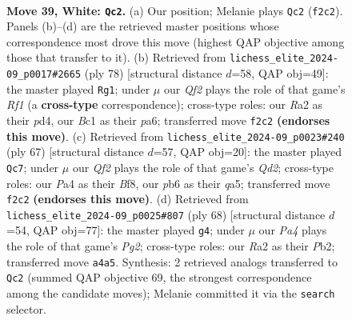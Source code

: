 \documentclass[11pt]{article}
\begin{document}
\begin{figure}[p]\centering
\begin{subfigure}{0.46\textwidth}\centering
\resizebox{\linewidth}{!}{%
\newchessgame
\chessboard[
  setfen={7r/r3k3/1pp1p1p1/3q2p1/Pp1P4/3KP3/R4Q2/2B5 w - - 0 39},
  showmover=false,
  pgfstyle=straightmove, color=movearrow, markmove={f2-c2}
]}
\caption{}
\end{subfigure}\hfill
\begin{subfigure}{0.46\textwidth}\centering
\resizebox{\linewidth}{!}{%
\newchessgame
\chessboard[
  setfen={6rk/7p/p4q2/4pP2/1p1pQ3/1P1P3P/P6K/5R2 w - - 5 40},
  showmover=false,
  pgfstyle=straightmove, color=movearrow, markmove={f1-g1}
]}
\caption{}
\end{subfigure}
\\[4pt]
\begin{subfigure}{0.46\textwidth}\centering
\resizebox{\linewidth}{!}{%
\newchessgame
\chessboard[
  setfen={3k1b1r/3q1pp1/3p4/Q5Pp/1P1RpP1P/8/1BP5/1K6 b - - 2 34},
  showmover=false,
  pgfstyle=straightmove, color=movearrow, markmove={d7-c7}
]}
\caption{}
\end{subfigure}\hfill
\begin{subfigure}{0.46\textwidth}\centering
\resizebox{\linewidth}{!}{%
\newchessgame
\chessboard[
  setfen={4r1k1/5pp1/8/2p5/p7/PqPQ3P/1P4P1/K2R4 w - - 0 35},
  showmover=false,
  pgfstyle=straightmove, color=movearrow, markmove={g2-g4}
]}
\caption{}
\end{subfigure}
\caption{\textbf{Move 39, White: \texttt{Qc2}.} (a) Our position; Melanie plays \texttt{Qc2} (\texttt{f2c2}). Panels (b)--(d) are the retrieved master positions whose correspondence most drove this move (highest QAP objective among those that transfer to it). (b) Retrieved from \texttt{lichess\_elite\_2024-09\_p0017\#2665} (ply 78) [structural distance $d$=58, QAP obj=49]: the master played \texttt{Rg1}; under $\mu$ our \emph{Qf2} plays the role of that game's \emph{Rf1} (a \textbf{cross-type} correspondence); cross-type roles: our \emph{R}a2 as their \emph{p}d4, our \emph{B}c1 as their \emph{p}a6; transferred move \texttt{f2c2} \textbf{(endorses this move)}. (c) Retrieved from \texttt{lichess\_elite\_2024-09\_p0023\#240} (ply 67) [structural distance $d$=57, QAP obj=20]: the master played \texttt{Qc7}; under $\mu$ our \emph{Qf2} plays the role of that game's \emph{Qd2}; cross-type roles: our \emph{P}a4 as their \emph{B}f8, our \emph{p}b6 as their \emph{q}a5; transferred move \texttt{f2c2} \textbf{(endorses this move)}. (d) Retrieved from \texttt{lichess\_elite\_2024-09\_p0025\#807} (ply 68) [structural distance $d$=54, QAP obj=77]: the master played \texttt{g4}; under $\mu$ our \emph{Pa4} plays the role of that game's \emph{Pg2}; cross-type roles: our \emph{R}a2 as their \emph{P}b2; transferred move \texttt{a4a5}. Synthesis: 2 retrieved analogs transferred to \texttt{Qc2} (summed QAP objective 69, the strongest correspondence among the candidate moves); Melanie committed it via the \texttt{search} selector.}
\label{fig:thought-m76}
\end{figure}
\end{document}
